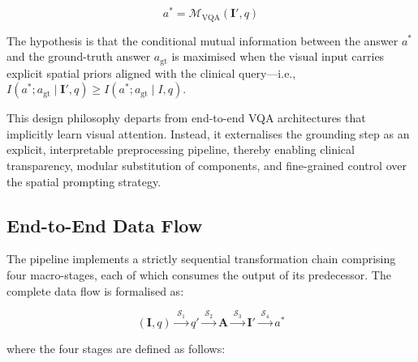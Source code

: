 \[
a^{*} = \mathcal{M}_{\text{VQA}}(\mathbf{I}', q)
\]

The hypothesis is that the conditional mutual information between the answer $a^{*}$ and the ground-truth answer $a_{\text{gt}}$ is maximised when the visual input carries explicit spatial priors aligned with the clinical query—i.e., $I\left(a^{*}; a_{\text{gt}} \mid \mathbf{I}', q\right) \geq I\left(a^{*}; a_{\text{gt}} \mid I, q\right)$.

This design philosophy departs from end-to-end VQA architectures that implicitly learn visual attention. Instead, it externalises the grounding step as an explicit, interpretable preprocessing pipeline, thereby enabling clinical transparency, modular substitution of components, and fine-grained control over the spatial prompting strategy.

\subsection{End-to-End Data Flow}
\label{sec:3_1_2}
The pipeline implements a strictly sequential transformation chain comprising four macro-stages, each of which consumes the output of its predecessor. The complete data flow is formalised as:

\[
(\mathbf{I}, q) \xrightarrow{\;\mathcal{S}_1\;} q' \xrightarrow{\;\mathcal{S}_2\;} \mathbf{A} \xrightarrow{\;\mathcal{S}_3\;} \mathbf{I}' \xrightarrow{\;\mathcal{S}_4\;} a^{*}
\]

where the four stages are defined as follows:

